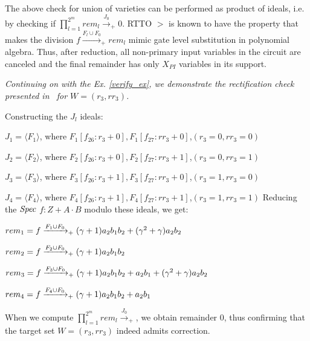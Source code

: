 The above check for union of varieties can be performed 
as product of ideals, i.e. by checking if $\prod_{l=1}^{2^m} 
rem_l\xrightarrow{J_{0}}_+0$.
RTTO $>$ is known to have the property that makes the division 
$f\xrightarrow{F_l\cup F_{0}}_+ rem_l$ mimic gate level substitution
in polynomial algebra.
Thus, after reduction, 
all non-primary input variables in the circuit are canceled and the 
final remainder has only $X_{PI}$ variables in its support.

\begin{Example}
\label{ex:3}
{\it 
Continuing on with the Ex. \ref{verify_ex}, we
demonstrate the rectification check presented in~\cite{Vkrao:ISQED21}
for $W=(r_3,rr_3)$. 

Constructing the $J_l$ ideals:
\bi
\item {\small$J_1 = \langle F_1\rangle$, where $F_1[f_{26}: r_3+0],F_1[f_{27}: rr_3 + 0]$},$(r_3 =0, rr_3 = 0)$ 
\item {\small$J_2 = \langle F_2\rangle$, where $F_2[f_{26}: r_3+0],F_2[f_{27}: rr_3 + 1]$},$(r_3 =0, rr_3 = 1)$
\item {\small$J_3 = \langle F_3\rangle$, where $F_3[f_{26}: r_3+1],F_3[f_{27}: rr_3 + 0]$},$(r_3 =1, rr_3 = 0)$
\item {\small$J_4 = \langle F_4\rangle$, where $F_4[f_{26}: r_3+1],F_4[f_{27}: rr_3 + 1]$},$(r_3 =1, rr_3 = 1)$
\ei
Reducing the ${\it Spec}$ $f: Z+A\cdot B$ modulo these ideals, we get:
\bi
\item $rem_1 = f \xrightarrow[]{F_1\cup F_{0}}_+(\gamma+1)a_2b_1b_2+(\gamma^2+\gamma)a_2b_2$
\item $rem_2 = f \xrightarrow[]{F_2\cup F_{0}}_+(\gamma+1)a_2b_1b_2$
\item $rem_3 = f \xrightarrow[]{F_3\cup F_{0}}_+(\gamma+1)a_2b_1b_2+a_2b_1 + (\gamma^2+\gamma)a_2b_2$
\item $rem_4 = f \xrightarrow[]{F_4\cup F_{0}}_+(\gamma+1)a_2b_1b_2+a_2b_1$
\ei

When we compute $\prod_{l=1}^{2^m} 
rem_l\xrightarrow{J_{0}}_+$, 
 we obtain remainder 0, thus confirming
that the target set $W=(r_3,rr_3)$ indeed admits correction.
}
\end{Example}

